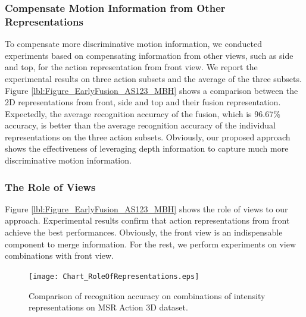 \documentclass[final,3p,times,twocolumn]{elsarticle}
\begin{document}
\subsubsection{Compensate Motion Information from Other Representations}

To compensate more discriminative motion information, we conducted experiments based on compensating information from other views, such as side and top, for the action representation from front view.
We report the experimental results on three action subsets and the average of the three subsets.
Figure \ref{lbl:Figure_EarlyFusion_AS123_MBH} shows a comparison between the 2D representations from front, side and top and their fusion representation.
Expectedly, the average recognition accuracy of the fusion, which is 96.67\% accuracy, is better than the average recognition accuracy of the individual representations on the three action subsets.
Obviously, our proposed approach shows the effectiveness of leveraging depth information to capture much more discriminative motion information.


\subsubsection{The Role of Views}

Figure \ref{lbl:Figure_EarlyFusion_AS123_MBH} shows the role of views to our approach.
Experimental results confirm that action representations from front achieve the best performances. Obviously, the front view is an indispensable component to merge information.
For the rest, we perform experiments on view combinations with front view.

\begin{figure}[h]
	\begin{center}
		\texttt{[image: Chart\_RoleOfRepresentations.eps]}
	\end{center}
	\caption{\label{Figure_CombinationsFRONTSIDETOP}Comparison of recognition accuracy on combinations of intensity representations on MSR Action 3D dataset.}
\end{figure}
\end{document}
